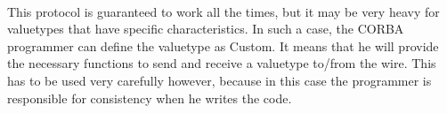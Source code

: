 \paragraph{} This protocol is guaranteed to work all the times, but it
may be very heavy for valuetypes that have specific
characteristics. In such a case, the CORBA programmer can define the
valuetype as Custom. It means that he will provide the necessary
functions to send and receive a valuetype to/from the wire. This has
to be used very carefully however, because in this case the programmer
is responsible for consistency when he writes the code.
